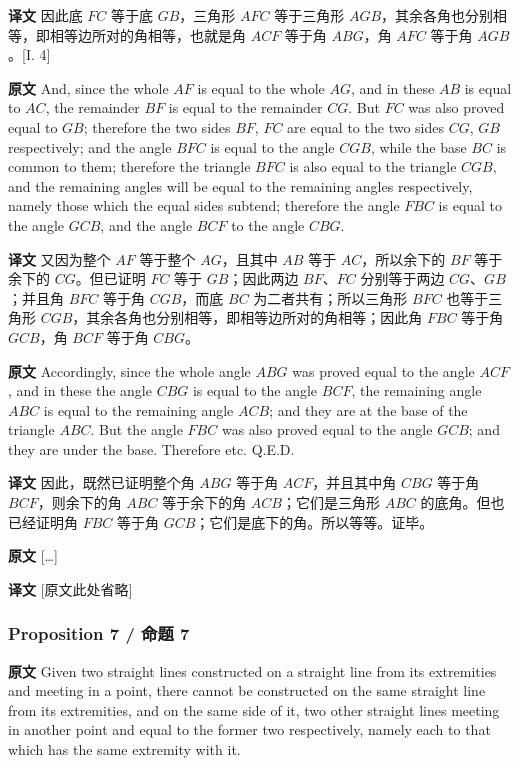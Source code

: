 \documentclass[UTF8,zihao=-4]{ctexart}
\begin{document}
\noindent\textbf{译文} 因此底 $FC$ 等于底 $GB$，三角形 $AFC$ 等于三角形 $AGB$，其余各角也分别相等，即相等边所对的角相等，也就是角 $ACF$ 等于角 $ABG$，角 $AFC$ 等于角 $AGB$。[I. 4]

\noindent\textbf{原文} And, since the whole $AF$ is equal to the whole $AG$, and in these $AB$ is equal to $AC$, the remainder $BF$ is equal to the remainder $CG$. But $FC$ was also proved equal to $GB$; therefore the two sides $BF$, $FC$ are equal to the two sides $CG$, $GB$ respectively; and the angle $BFC$ is equal to the angle $CGB$, while the base $BC$ is common to them; therefore the triangle $BFC$ is also equal to the triangle $CGB$, and the remaining angles will be equal to the remaining angles respectively, namely those which the equal sides subtend; therefore the angle $FBC$ is equal to the angle $GCB$, and the angle $BCF$ to the angle $CBG$.

\noindent\textbf{译文} 又因为整个 $AF$ 等于整个 $AG$，且其中 $AB$ 等于 $AC$，所以余下的 $BF$ 等于余下的 $CG$。但已证明 $FC$ 等于 $GB$；因此两边 $BF$、$FC$ 分别等于两边 $CG$、$GB$；并且角 $BFC$ 等于角 $CGB$，而底 $BC$ 为二者共有；所以三角形 $BFC$ 也等于三角形 $CGB$，其余各角也分别相等，即相等边所对的角相等；因此角 $FBC$ 等于角 $GCB$，角 $BCF$ 等于角 $CBG$。

\noindent\textbf{原文} Accordingly, since the whole angle $ABG$ was proved equal to the angle $ACF$, and in these the angle $CBG$ is equal to the angle $BCF$, the remaining angle $ABC$ is equal to the remaining angle $ACB$; and they are at the base of the triangle $ABC$. But the angle $FBC$ was also proved equal to the angle $GCB$; and they are under the base. Therefore etc. Q.E.D.

\noindent\textbf{译文} 因此，既然已证明整个角 $ABG$ 等于角 $ACF$，并且其中角 $CBG$ 等于角 $BCF$，则余下的角 $ABC$ 等于余下的角 $ACB$；它们是三角形 $ABC$ 的底角。但也已经证明角 $FBC$ 等于角 $GCB$；它们是底下的角。所以等等。证毕。

\noindent\textbf{原文} [\ldots]

\noindent\textbf{译文} [原文此处省略]

\subsubsection*{Proposition 7 / 命题 7}

\noindent\textbf{原文} Given two straight lines constructed on a straight line from its extremities and meeting in a point, there cannot be constructed on the same straight line from its extremities, and on the same side of it, two other straight lines meeting in another point and equal to the former two respectively, namely each to that which has the same extremity with it.
\end{document}
